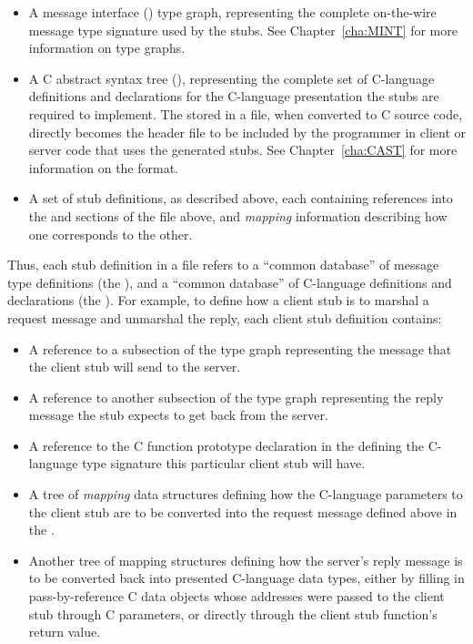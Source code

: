 \begin{itemize}
  \item A message interface (\MINT{}) type graph, representing the complete
  on-the-wire message type signature used by the stubs.  See
  Chapter~\ref{cha:MINT} for more information on \MINT{} type graphs.

  \item A C abstract syntax tree (\CAST{}), representing the complete set of
  C-language definitions and declarations for the C-language presentation the
  stubs are required to implement.  The \CAST{} stored in a \PRESC{} file, when
  converted to C source code, directly becomes the header file to be included
  by the \RPC{} programmer in client or server code that uses the generated
  stubs.  See Chapter~\ref{cha:CAST} for more information on the \CAST{}
  format.

  \item A set of stub definitions, as described above, each containing
  references into the \MINT{} and \CAST{} sections of the file above, and
  \emph{mapping} information describing how one corresponds to the other.
\end{itemize}

Thus, each stub definition in a \PRESC{} file refers to a ``common database''
of message type definitions (the \MINT{}), and a ``common database'' of
C-language definitions and declarations (the \CAST{})\@.  For example, to
define how a client stub is to marshal a request message and unmarshal the
reply, each client stub definition contains:

\begin{itemize}
  \item A reference to a subsection of the \MINT{} type graph representing the
  message that the client stub will send to the server.

  \item A reference to another subsection of the \MINT{} type graph
  representing the reply message the stub expects to get back from the server.

  \item A reference to the C function prototype declaration in the \CAST{}
  defining the C-language type signature this particular client stub will have.

  \item A tree of \emph{mapping} data structures defining how the C-language
  parameters to the client stub are to be converted into the request message
  defined above in the \MINT{}\@.

  \item Another tree of mapping structures defining how the server's reply
  message is to be converted back into presented C-language data types, either
  by filling in pass-by-reference C data objects whose addresses were passed to
  the client stub through C parameters, or directly through the client stub
  function's return value.
\end{itemize}

